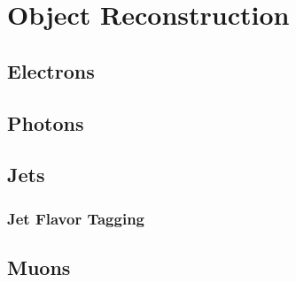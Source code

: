 \section{Object Reconstruction} \label{sec:reconstruction}
\subsection{Electrons}
\subsection{Photons} %
\subsection{Jets}
\subsubsection{Jet Flavor Tagging}
\subsection{Muons}
